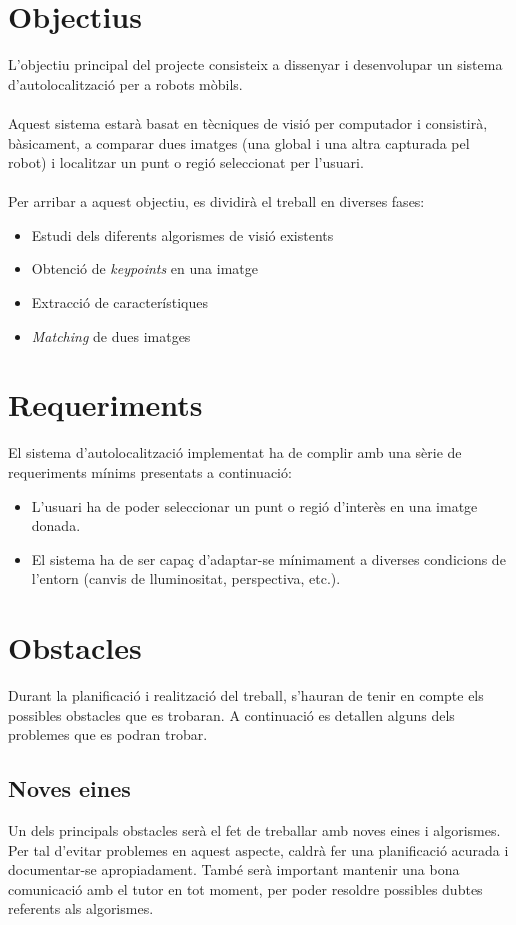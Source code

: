 \section{Objectius}
	L'objectiu principal del projecte consisteix a dissenyar i desenvolupar un sistema d'autolocalització per a robots mòbils.\\\\
	Aquest sistema estarà basat en tècniques de visió per computador i consistirà, bàsicament, a comparar dues imatges (una global i una altra capturada pel robot)
	i localitzar un punt o regió seleccionat per l'usuari.\\\\	
	Per arribar a aquest objectiu, es dividirà el treball en diverses fases:\\
	\begin{itemize}
		\item Estudi dels diferents algorismes de visió existents
		\item Obtenció de \textit{keypoints} en una imatge
		\item Extracció de característiques
		\item \textit{Matching} de dues imatges
	\end{itemize}
\section{Requeriments}
	El sistema d'autolocalització implementat ha de complir amb una sèrie de requeriments mínims presentats a continuació:\\
	\begin{itemize}
		\item L'usuari ha de poder seleccionar un punt o regió d'interès en una imatge donada.
		\item El sistema ha de ser capaç d'adaptar-se mínimament a diverses condicions de l'entorn (canvis de lluminositat, perspectiva, etc.).
	\end{itemize}
\section{Obstacles}
	Durant la planificació i realització del treball, s'hauran de tenir en compte els possibles obstacles que es trobaran. A continuació es detallen alguns dels problemes que es podran trobar.
	\subsection{Noves eines}
		Un dels principals obstacles serà el fet de treballar amb noves eines i algorismes. Per tal d'evitar problemes en aquest aspecte, caldrà fer una planificació acurada i documentar-se apropiadament.
		També serà important mantenir una bona comunicació amb el tutor en tot moment, per poder resoldre possibles dubtes referents als algorismes.
